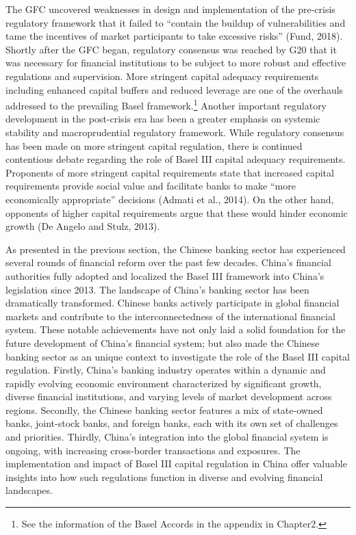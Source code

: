 \documentclass[
  12pt,
  a4paper,
]{scrreprt}
\begin{document}
The GFC uncovered weaknesses in design and implementation of the
pre-crisis regulatory framework that it failed to ``contain the buildup
of vulnerabilities and tame the incentives of market participants to
take excessive risks'' (Fund, 2018). Shortly after the GFC began,
regulatory consensus was reached by G20 that it was necessary for
financial institutions to be subject to more robust and effective
regulations and supervision. More stringent capital adequacy
requirements including enhanced capital buffers and reduced leverage are
one of the overhauls addressed to the prevailing Basel
framework.\footnote{See the information of the Basel Accords in the
  appendix in Chapter2.} Another important regulatory development in the
post-crisis era has been a greater emphasis on systemic stability and
macroprudential regulatory framework. While regulatory consensus has
been made on more stringent capital regulation, there is continued
contentious debate regarding the role of Basel III capital adequacy
requirements. Proponents of more stringent capital requirements state
that increased capital requirements provide social value and facilitate
banks to make ``more economically appropriate'' decisions (Admati et
al., 2014). On the other hand, opponents of higher capital requirements
argue that these would hinder economic growth (De Angelo and Stulz,
2013).

As presented in the previous section, the Chinese banking sector has
experienced several rounds of financial reform over the past few
decades. China's financial authorities fully adopted and localized the
Basel III framework into China's legislation since 2013. The landscape
of China's banking sector has been dramatically transformed. Chinese
banks actively participate in global financial markets and contribute to
the interconnectedness of the international financial system. These
notable achievements have not only laid a solid foundation for the
future development of China's financial system; but also made the
Chinese banking sector as an unique context to investigate the role of
the Basel III capital regulation. Firstly, China's banking industry
operates within a dynamic and rapidly evolving economic environment
characterized by significant growth, diverse financial institutions, and
varying levels of market development across regions. Secondly, the
Chinese banking sector features a mix of state-owned banks, joint-stock
banks, and foreign banks, each with its own set of challenges and
priorities. Thirdly, China's integration into the global financial
system is ongoing, with increasing cross-border transactions and
exposures. The implementation and impact of Basel III capital regulation
in China offer valuable insights into how such regulations function in
diverse and evolving financial landscapes.
\end{document}
